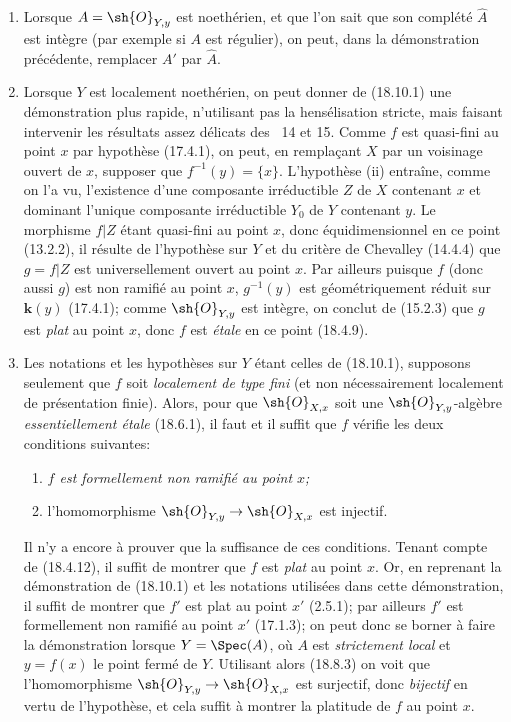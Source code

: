 \begin{remarks}[18.10.2]
\label{IV.18.10.2}
\begin{enumerate}
  \item[(i)] Lorsque $A=\sh{O}_{Y,y}$ est noethérien, et que l'on sait que son complété $\widehat A$ est intègre (par exemple si $A$ est régulier), on peut, dans la démonstration précédente, remplacer $A'$ par $\widehat A$.
  \item[(ii)] Lorsque $Y$ est localement noethérien, on peut donner de (18.10.1) une démonstration plus rapide, n'utilisant pas la hensélisation stricte, mais faisant intervenir les résultats assez délicats des \textsection\textsection~14 et 15. Comme $f$ est quasi-fini au point $x$ par hypothèse (17.4.1), on peut, en remplaçant $X$ par un voisinage ouvert de $x$, supposer que $f^{-1}(y)=\{x\}$. L'hypothèse (ii) entraîne, comme on l'a vu, l'existence d'une composante irréductible $Z$ de $X$ contenant $x$ et dominant l'unique composante irréductible $Y_0$ de $Y$ contenant $y$. Le morphisme $f|Z$ étant quasi-fini au point $x$, donc équidimensionnel en ce point (13.2.2), il résulte de l'hypothèse sur $Y$ et du critère de Chevalley (14.4.4) que $g=f|Z$ est universellement ouvert au point $x$. Par ailleurs puisque $f$ (donc aussi $g$) est non ramifié au point $x$, $g^{-1}(y)$ est géométriquement réduit sur $\boldsymbol{k}(y)$ (17.4.1); comme $\sh{O}_{Y,y}$ est intègre, on conclut de (15.2.3) que $g$ est \emph{plat} au point $x$, donc $f$ est \emph{étale} en ce point (18.4.9).
  \item[(iii)] Les notations et les hypothèses sur $Y$ étant celles de (18.10.1), supposons seulement que $f$ soit \emph{localement de type fini} (et non nécessairement localement de présentation finie). Alors, pour que $\sh{O}_{X,x}$ soit une $\sh{O}_{Y,y}$-algèbre \emph{essentiellement étale} (18.6.1), il faut et il suffit que $f$ vérifie les deux conditions suivantes:


\begin{enumerate}
  \item[$1^\circ$] \itshape $f$ est formellement non ramifié au point $x$;
  \item[$2^\circ$] l'homomorphisme $\sh{O}_{Y,y}\to\sh{O}_{X,x}$ est injectif.
\end{enumerate}

Il n'y a encore à prouver que la suffisance de ces conditions. Tenant compte de (18.4.12), il suffit de montrer que $f$ est \emph{plat} au point $x$. Or, en reprenant la démonstration de (18.10.1) et les notations utilisées dans cette démonstration, il suffit de montrer que $f'$ est plat au point $x'$ (2.5.1); par ailleurs $f'$ est formellement non ramifié au point $x'$ (17.1.3); on peut donc se borner à faire la démonstration lorsque $Y=\Spec(A)$, où $A$ est \emph{strictement local} et $y=f(x)$ le point fermé de $Y$. Utilisant alors (18.8.3) on voit que l'homomorphisme $\sh{O}_{Y,y}\to\sh{O}_{X,x}$ est surjectif, donc \emph{bijectif} en vertu de l'hypothèse, et cela suffit à montrer la platitude de $f$ au point $x$.


\end{enumerate}
\end{remarks}
